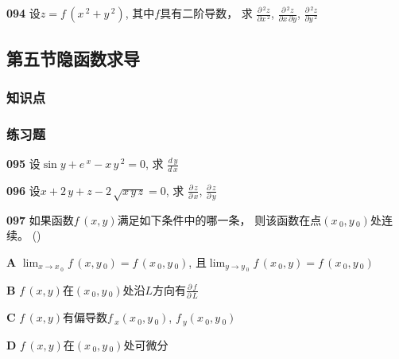 \documentclass[a4paper,10pt]{article} %
\begin{document}
\par\noindent \textbf{094} \quad 设$z=f\,(x\,^2+y\,^2)$, 其中$f$具有二阶导数， 求
$\displaystyle\frac{\partial \,^2z}{\partial x\,^2}$, 
$\displaystyle\frac{\partial \,^2z}{\partial x\,\partial y}$,
$\displaystyle\frac{\partial \,^2z}{\partial y\,^2}$





\textheight


\newpage
\subsection{第五节\quad 隐函数求导}
\subsubsection{知识点}
\subsubsection{练习题}

\par\noindent \textbf{095} \quad 设$\sin y+e\,^x-x\,y\,^2=0$, 求
$\displaystyle\frac{d\,y}{d\,x}$





\textheight


\par\noindent \textbf{096} \quad 设$x+2\,y+z-2\,\sqrt{x\,y\,z}=0$, 求
$\displaystyle\frac{\partial\,z}{\partial\,x}$,
$\displaystyle\frac{\partial\,z}{\partial\,y}$





\textheight


\par\noindent \textbf{097} \quad 如果函数$f\,(x,y)$满足如下条件中的哪一条， 则该函数在点$(x\,_0,y\,_0)$处连续。
\hfill (\quad\quad\quad)
\par\noindent \textbf{A} \quad $\displaystyle \lim_{x\rightarrow x\,_0}f\,(x,y\,_0)=f\,(x\,_0,y\,_0)$, 
且$\displaystyle\lim_{y\rightarrow y\,_0}f\,(x\,_0,y)=f\,(x\,_0,y\,_0)$
\par\noindent \textbf{B} \quad $f\,(x,y)$在$(x\,_0,y\,_0)$处沿$L$方向有$\displaystyle \frac{\partial \,f}{\partial \,L}$
\par\noindent \textbf{C} \quad $f\,(x,y)$有偏导数$f\,_x(x\,_0,y\,_0)$, $f\,_y(x\,_0,y\,_0)$
\par\noindent \textbf{D} \quad $f\,(x,y)$在$(x\,_0,y\,_0)$处可微分
\end{document}
